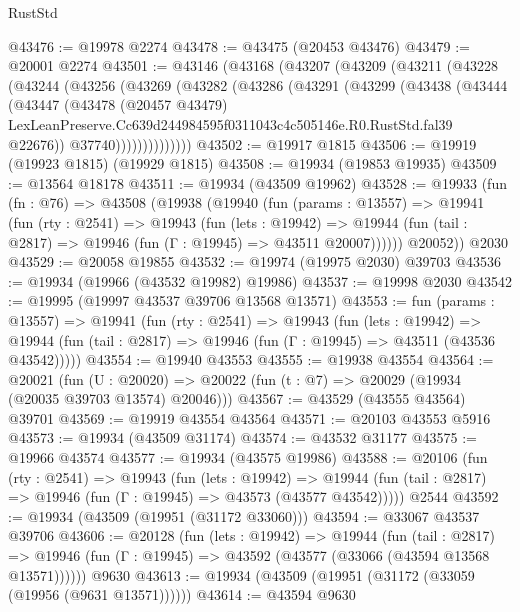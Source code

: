 \begin{lexlean}{RustStd}
\begin{coremodule}
@43476 := @19978 @2274
@43478 := @43475 (@20453 @43476)
@43479 := @20001 @2274
@43501 := @43146
    (@43168
      (@43207
        (@43209
          (@43211
            (@43228
              (@43244
                (@43256
                  (@43269
                    (@43282
                      (@43286
                        (@43291
                          (@43299
                            (@43438
                              (@43444
                                (@43447
                                  (@43478
                                    (@20457 @43479)
                                    LexLeanPreserve.Cc639d244984595f0311043c4c505146e.R0.RustStd.fal39
                                    @22676))
                                @37740))))))))))))))
@43502 := @19917 @1815
@43506 := @19919 (@19923 @1815) (@19929 @1815)
@43508 := @19934 (@19853 @19935)
@43509 := @13564 @18178
@43511 := @19934 (@43509 @19962)
@43528 := @19933
    (fun (fn : @76) =>
    @43508
      (@19938
        (@19940
          (fun (params : @13557) =>
          @19941
            (fun (rty : @2541) =>
            @19943
              (fun (lets : @19942) =>
              @19944 (fun (tail : @2817) => @19946 (fun (Γ : @19945) => @43511 @20007))))))
        @20052))
    @2030
@43529 := @20058 @19855
@43532 := @19974 (@19975 @2030) @39703
@43536 := @19934 (@19966 (@43532 @19982) @19986)
@43537 := @19998 @2030
@43542 := @19995 (@19997 @43537 @39706 @13568 @13571)
@43553 := fun (params : @13557) =>
  @19941
    (fun (rty : @2541) =>
    @19943
      (fun (lets : @19942) =>
      @19944 (fun (tail : @2817) => @19946 (fun (Γ : @19945) => @43511 (@43536 @43542)))))
@43554 := @19940 @43553
@43555 := @19938 @43554
@43564 := @20021
    (fun (U : @20020) => @20022 (fun (t : @7) => @20029 (@19934 (@20035 @39703 @13574) @20046)))
@43567 := @43529 (@43555 @43564) @39701
@43569 := @19919 @43554 @43564
@43571 := @20103 @43553 @5916
@43573 := @19934 (@43509 @31174)
@43574 := @43532 @31177
@43575 := @19966 @43574
@43577 := @19934 (@43575 @19986)
@43588 := @20106
    (fun (rty : @2541) =>
    @19943
      (fun (lets : @19942) =>
      @19944 (fun (tail : @2817) => @19946 (fun (Γ : @19945) => @43573 (@43577 @43542)))))
    @2544
@43592 := @19934 (@43509 (@19951 (@31172 @33060)))
@43594 := @33067 @43537 @39706
@43606 := @20128
    (fun (lets : @19942) =>
    @19944
      (fun (tail : @2817) =>
      @19946 (fun (Γ : @19945) => @43592 (@43577 (@33066 (@43594 @13568 @13571))))))
    @9630
@43613 := @19934 (@43509 (@19951 (@31172 (@33059 (@19956 (@9631 @13571))))))
@43614 := @43594 @9630

\end{coremodule}
\end{lexlean}
